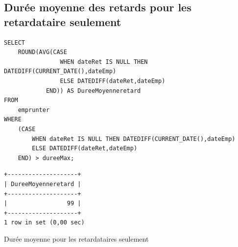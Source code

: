 \documentclass{article}
\begin{document}
\subsection{Durée moyenne des retards pour les retardataire seulement}
\begin{center}
\begin{minipage}{0.7\linewidth}
\begin{listing}[H]
\begin{verbatim}
SELECT 
    ROUND(AVG(CASE
                WHEN dateRet IS NULL THEN DATEDIFF(CURRENT_DATE(),dateEmp)
                ELSE DATEDIFF(dateRet,dateEmp)
            END)) AS DureeMoyenneretard
FROM
    emprunter
WHERE
    (CASE
        WHEN dateRet IS NULL THEN DATEDIFF(CURRENT_DATE(),dateEmp)
        ELSE DATEDIFF(dateRet,dateEmp)
    END) > dureeMax;
\end{verbatim}
\begin{verbatim}
+--------------------+
| DureeMoyenneretard |
+--------------------+
|                 99 |
+--------------------+
1 row in set (0,00 sec)
\end{verbatim}
\caption{Durée moyenne pour les retardataires seulement}
\end{listing}
\end{minipage}
\end{center}
\end{document}
